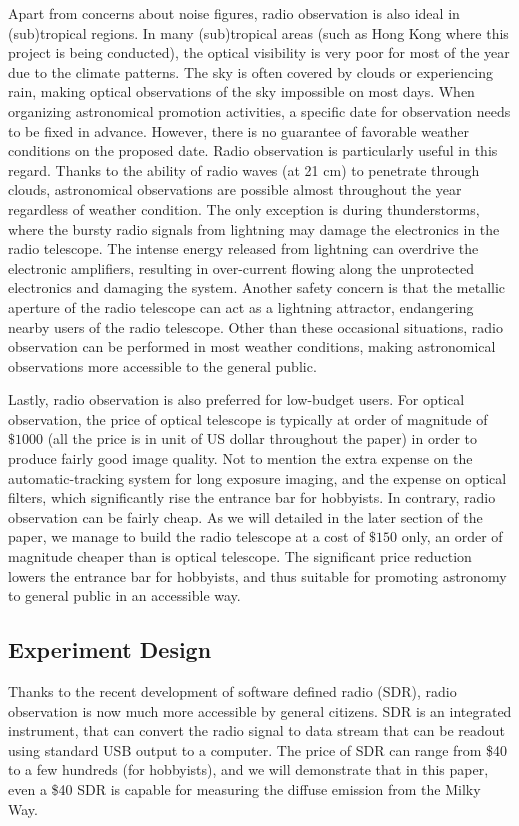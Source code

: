\documentclass[12pt]{article}
\begin{document}
    Apart from concerns about noise figures, radio observation is also ideal in (sub)tropical regions.
    In many (sub)tropical areas (such as Hong Kong where this project is being conducted), the optical visibility is very poor for most of the year due to the climate patterns. The sky is often covered by clouds or experiencing rain, making optical observations of the sky impossible on most days. 
    When organizing astronomical promotion activities, a specific date for observation needs to be fixed in advance. However, there is no guarantee of favorable weather conditions on the proposed date.
    Radio observation is particularly useful in this regard. 
    Thanks to the ability of radio waves (at 21 cm) to penetrate through clouds, astronomical observations are possible almost throughout the year regardless of weather condition. 
    The only exception is during thunderstorms, where the bursty radio signals from lightning may damage the electronics in the radio telescope. 
    The intense energy released from lightning can overdrive the electronic amplifiers, resulting in over-current flowing along the unprotected electronics and damaging the system.
    Another safety concern is that the metallic aperture of the radio telescope can act as a lightning attractor, endangering nearby users of the radio telescope.
    Other than these occasional situations, radio observation can be performed in most weather conditions, making astronomical observations more accessible to the general public.

    Lastly, radio observation is also preferred for low-budget users. 
    For optical observation, the price of optical telescope is typically at order of magnitude of $\$1000$ (all the price is in unit of US dollar throughout the paper) in order to produce fairly good image quality. Not to mention the extra expense on the automatic-tracking system for long exposure imaging, and the expense on optical filters, which significantly rise the entrance bar for hobbyists.
    In contrary, radio observation can be fairly cheap.
    As we will detailed in the later section of the paper, we manage to build the radio telescope at a cost of $\$150$ only, an order of magnitude cheaper than is optical telescope. 
    The significant price reduction lowers the entrance bar for hobbyists, and thus suitable for promoting astronomy to general public in an accessible way.
    
    \subsection{Experiment Design}
    Thanks to the recent development of software defined radio (SDR), radio observation is now much more accessible by general citizens. 
    SDR is an integrated instrument, that can convert the radio signal to data stream that can be readout using standard USB output to a computer.
    The price of SDR can range from \$40 to a few hundreds (for hobbyists), and we will demonstrate that in this paper, even a \$40 SDR is capable for measuring the diffuse emission from the Milky Way.
\end{document}
